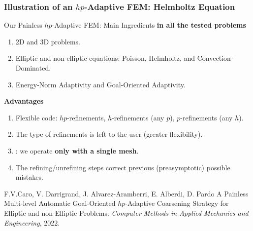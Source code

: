 \documentclass[10pt,aspectratio=149]{beamer}
\begin{document}
\begin{frame}
	\frametitle{Illustration of an $hp$-Adaptive FEM: Helmholtz Equation}
\end{frame}
\begin{frame}{Our Painless $hp$-Adaptive FEM: Main Ingredients}
\textbf{ in all the tested problems}
\setlength{\itemsep}{1mm}
\begin{enumerate}
  \item 2D and 3D problems.
  \item Elliptic and non-elliptic equations: Poisson, Helmholtz, and Convection-Dominated.
  \item Energy-Norm Adaptivity and Goal-Oriented Adaptivity.
\end{enumerate}

\vspace{5mm}

\textbf{Advantages}
\begin{enumerate}
  \item \alert{Flexible} code: $hp$-refinements, $h$-refinements (any $p$), $p$-refinements (any $h$).
  \item The type of refinements is left to the user (greater flexibility).
  \item {}: we operate \textbf{only with a single mesh}.
  \item The refining/unrefining steps \alert{correct} previous (preasymptotic) possible \alert{mistakes}.
\end{enumerate}

\vspace{2mm}
\begin{thebibliography}{10}
		\beamertemplatearticlebibitems
		\scriptsize
		F.V.Caro, V. Darrigrand, J. Alvarez-Aramberri, E. Alberdi, D. Pardo
		\newblock A Painless Multi-level Automatic Goal-Oriented $hp$-Adaptive Coarsening Strategy for Elliptic and non-Elliptic Problems. \emph{Computer Methods in Applied Mechanics and Engineering}, 2022.
	\end{thebibliography}
\end{frame}
\end{document}
